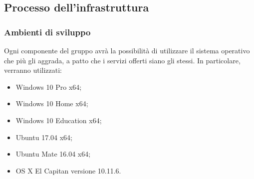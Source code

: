 


\subsection{Processo dell'infrastruttura}

\subsubsection{Ambienti di sviluppo}
	Ogni componente del gruppo avrà la possibilità di utilizzare il sistema operativo che più gli aggrada, a patto che i servizi offerti siano gli stessi. In particolare, verranno utilizzati:
	\begin{itemize}
		\item Windows 10 Pro x64;
		\item Windows 10 Home x64;
		\item Windows 10 Education x64;
		\item Ubuntu 17.04 x64;
		\item Ubuntu Mate 16.04 x64;
		\item OS X El Capitan versione 10.11.6.
	\end{itemize}
	
